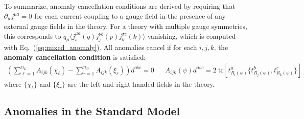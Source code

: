\documentclass[11pt, oneside]{article}   	%
\theoremstyle{definition}
\numberwithin{equation}{subsection}		%
\begin{document}
To summarize, anomaly cancellation conditions are derived by requiring that $\partial_\mu j^{\mu a} = 0$ for each current coupling to a gauge field 
in the presence of any external gauge fields in the theory. For a theory with multiple gauge symmetries, this corresponds to $q_\mu \langle j_i^{\mu a}(q)
j_j^{\nu b}(p) j_k^{\sigma c}(k)\rangle$ vanishing, which is computed with Eq.~(\ref{eq:mixed_anomaly}). All anomalies cancel if for each $i, j, k$, 
the \textbf{anomaly cancellation condition} is satisfied:
\begin{align}
	\left(\sum_{\ell = 1}^{n_L} A_{ijk}(\chi_\ell) - \sum_{r = 1}^{n_R} A_{ijk}(\xi_r)\right) d^{abc} = 0 && A_{ijk}(\psi) d^{abc} = 2\;\mathrm{tr}\left[t^a_{R_i(\psi)} \{ t^b_{R_j(\psi)}, 
	t^c_{R_k(\psi)} \} \right]
	\label{eq:anomaly_cancellation}
\end{align}
where $\{\chi_\ell\}$ and $\{\xi_r\}$ are the left and right handed fields in the theory.

\subsection{Anomalies in the Standard Model}
\end{document}
